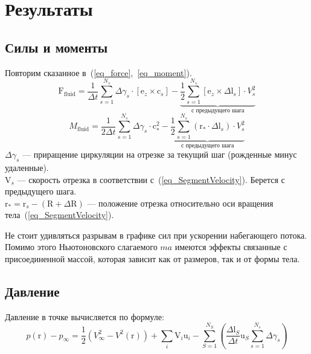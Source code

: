 \documentclass[14pt]{extreport}
\newcommand{\br}[1]{\boldsymbol{\mathrm{#1}}}
\renewcommand{\vec}[1]{\br{#1}}
\begin{document}

\section{Результаты}
\subsection{Силы и моменты}

Повторим сказанное в~(\ref{eq_force},~\ref{eq_moment}).
\begin{equation}
{\vec F_\text{fluid}} = 
\frac{1}{\Delta t} \sum\limits_{s=1}^{N_s} {\Delta \gamma_s \cdot [\vec e_z \times \vec c_s]} -
\underbrace {
	\frac{1}{2} \sum\limits_{s=1}^{N_s}
		[\vec e_z \times \Delta \vec l_s] \cdot V_s^2
}_{\text{с предыдущего шага}}
\end{equation}
%
\begin{equation}
M_\text{fluid} =
\frac{1}{2\Delta t}\sum\limits_{s=1}^{N_s} { \Delta \gamma_s \cdot \vec c_*^2 }
-
\underbrace {
	\frac{1}{2} \sum\limits_{s=1}^{N_s}
		(\vec r_* \cdot \Delta \vec l_s) \cdot V_s^2
}_{\text{с предыдущего шага}}
\end{equation}
%
$\Delta \gamma_s$ --- приращение циркуляции на отрезке за текущий шаг (рожденные минус удаленные).\\
$\vec V_s$ --- скорость отрезка в соответствии с~(\ref{eq_SegmentVelocity}). Берется с предыдущего шага.\\
$\vec r_* = \vec r_s - (\vec R + \Delta \vec R)$ --- положение отрезка относительно оси вращения тела~(\ref{eq_SegmentVelocity}).

Не стоит удивляться разрывам в графике сил при ускорении набегающего потока. Помимо этого Ньютоновского слагаемого $ma$ имеются эффекты связанные с присоединенной массой, которая зависит как от размеров, так и от формы тела.

\subsection{Давление}
Давление в точке вычисляется по формуле:
\begin{equation}
p(\vec r) - p_\infty =
\frac{1}{2} \left( V^2_\infty - V^2(\vec r) \right) 
+ \sum\limits_i{\vec V_i \vec u_i}
-\sum\limits_{S=1}^{N_S}
{
\left (
	\frac{\Delta \vec l_S}{\Delta t} \vec u_S \sum_{s=1}^{N_s} {\Delta\gamma_s}
\right )
}
\end{equation}
\end{document}
